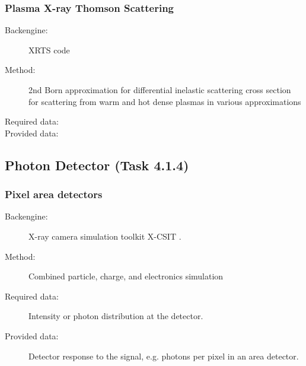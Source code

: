 \documentclass[12pt]{scrartcl}
\begin{document}
\subsubsection{Plasma X-ray Thomson Scattering}
\begin{description}
  \item[Backengine:] XRTS code
  \item[Method:] 2nd Born approximation for differential inelastic scattering cross section for scattering from warm and hot dense plasmas in various
    approximations \cite{Gregori2009, Fortmann2009d, Fortmann2010a}
  \item[Required data:]
  \item[Provided data:]
\end{description}
%
\subsection{Photon Detector (Task 4.1.4)}
\subsubsection{Pixel area detectors}
\begin{description}
  \item[Backengine:] X-ray camera simulation toolkit X-CSIT \cite{Joy2015}.
  \item[Method:] Combined particle, charge, and electronics simulation
  \item[Required data:] Intensity or photon distribution at the detector.
  \item[Provided data:] Detector response to the signal, e.g. photons per pixel in an area detector.
\end{description}

\printbibliography
\end{document}
